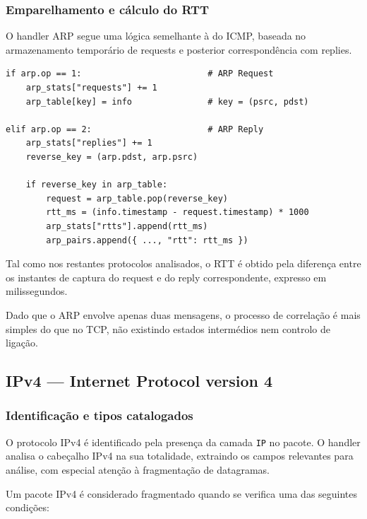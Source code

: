 \documentclass[a4paper,12pt]{article}
\begin{document}
\subsubsection{Emparelhamento e cálculo do RTT}

O handler ARP segue uma lógica semelhante à do ICMP, baseada no armazenamento temporário de requests e posterior correspondência com replies.

\vspace{0.5em}

\begin{lstlisting}[style=python]
if arp.op == 1:                         # ARP Request
    arp_stats["requests"] += 1
    arp_table[key] = info               # key = (psrc, pdst)

elif arp.op == 2:                       # ARP Reply
    arp_stats["replies"] += 1
    reverse_key = (arp.pdst, arp.psrc)

    if reverse_key in arp_table:
        request = arp_table.pop(reverse_key)
        rtt_ms = (info.timestamp - request.timestamp) * 1000
        arp_stats["rtts"].append(rtt_ms)
        arp_pairs.append({ ..., "rtt": rtt_ms })
\end{lstlisting}

Tal como nos restantes protocolos analisados, o RTT é obtido pela diferença entre os instantes de captura do request e do reply correspondente, expresso em milissegundos.

Dado que o ARP envolve apenas duas mensagens, o processo de correlação é mais simples do que no TCP, não existindo estados intermédios nem controlo de ligação.



\subsection{IPv4 — Internet Protocol version 4}

\subsubsection{Identificação e tipos catalogados}

O protocolo IPv4 é identificado pela presença da camada \texttt{IP} no pacote. O handler
analisa o cabeçalho IPv4 na sua totalidade, extraindo os campos relevantes para análise,
com especial atenção à fragmentação de datagramas.

Um pacote IPv4 é considerado fragmentado quando se verifica uma das seguintes condições:
\end{document}
